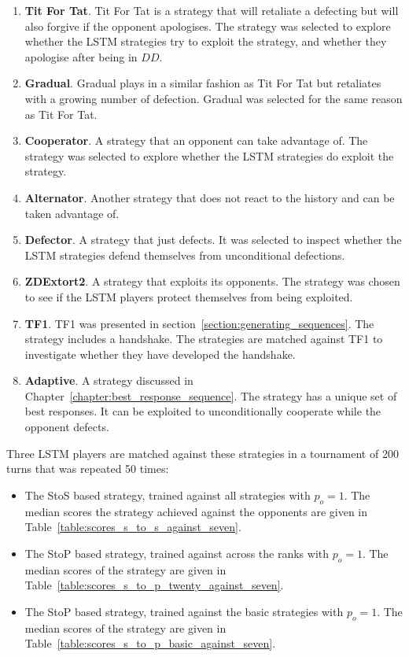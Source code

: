 \begin{enumerate}
    \item \textbf{Tit For Tat}. Tit For Tat is a strategy that will retaliate
    a defecting but will also forgive if the opponent apologises. The strategy was
    selected to explore whether the LSTM strategies try to exploit the strategy,
    and whether they apologise after being in \(DD\).
    \item \textbf{Gradual}. Gradual plays in a similar fashion as Tit For Tat but
    retaliates with a growing number of defection. Gradual was selected for the
    same reason as Tit For Tat.
    \item \textbf{Cooperator}. A strategy that an opponent can take advantage
    of. The strategy was selected to explore whether the LSTM strategies do
    exploit the strategy.
    \item \textbf{Alternator}. Another strategy that does not react to the history
    and can be taken advantage of.
    \item \textbf{Defector}. A strategy that just defects. It was selected to inspect
    whether the LSTM strategies defend themselves from unconditional defections.
    \item \textbf{ZDExtort2}. A strategy that exploits its opponents. The
    strategy was chosen to see if the LSTM players protect themselves from being
    exploited.
    \item \textbf{TF1}. TF1 was presented in
    section~\ref{section:generating_sequences}. The strategy includes a
    handshake. The strategies are matched against TF1 to investigate whether they
    have developed the handshake.
    \item \textbf{Adaptive}. A strategy discussed in
    Chapter~\ref{chapter:best_response_sequence}. The strategy has a unique set
    of best responses. It can be exploited to unconditionally cooperate while
    the opponent defects.
\end{enumerate}

Three LSTM players are matched against these strategies in a tournament of
200 turns that was repeated 50 times:

\begin{itemize}
    \item The StoS based strategy, trained against all strategies with $p_o=1$.
    The median scores the strategy achieved against the opponents are
    given in Table~\ref{table:scores_s_to_s_against_seven}.
    \item The StoP based strategy, trained against across the ranks with
    $p_o=1$. The median scores of the strategy are given in
    Table~\ref{table:scores_s_to_p_twenty_against_seven}.
    \item The StoP based strategy, trained against the basic strategies with
    $p_o=1$. The median scores of the strategy are given in
    Table~\ref{table:scores_s_to_p_basic_against_seven}.
\end{itemize}

